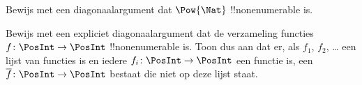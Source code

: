 \documentclass[../../../include/open-logic-section]{subfiles}
\begin{document}
\begin{prob}
Bewijs met een diagonaalargument dat $\Pow{\Nat}$ !!{nonenumerable} is.
\end{prob}

\begin{prob}\label{sfr:siz:nen:prob:f-posint}
Bewijs met een expliciet diagonaalargument dat de verzameling functies
$f \colon \PosInt \to \PosInt$ !!{nonenumerable} is. Toon dus aan dat er,
als $f_1$, $f_2$, \dots{} een lijst van functies is en iedere $f_i\colon
\PosInt \to \PosInt$ een functie is, een $\overline{f}\colon \PosInt \to \PosInt$
bestaat die niet op deze lijst staat.
\end{prob}
\end{document}
